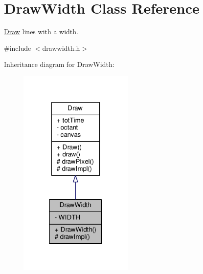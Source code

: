 \hypertarget{classDrawWidth}{}\section{Draw\+Width Class Reference}
\label{classDrawWidth}


\hyperlink{classDraw}{Draw} lines with a width.  




{\ttfamily \#include $<$drawwidth.\+h$>$}



Inheritance diagram for Draw\+Width\+:\nopagebreak
\begin{figure}[H]
\begin{center}
\leavevmode
\includegraphics[width=160pt]{classDrawWidth__inherit__graph}
\end{center}
\end{figure}


